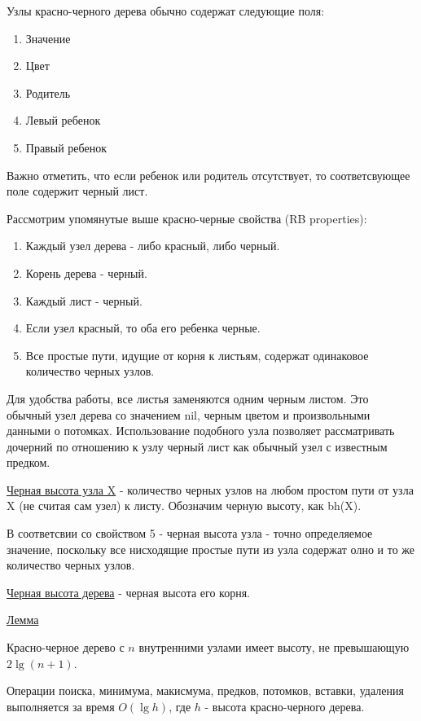 		Узлы красно-черного дерева обычно содержат следующие поля:
		\begin{enumerate}
			\item Значение
			\item Цвет
			\item Родитель
			\item Левый ребенок
			\item Правый ребенок
		\end{enumerate}	

		Важно отметить, что если ребенок или родитель отсутствует, то
		соответсвующее поле содержит черный лист.
		
		Рассмотрим упомянутые выше красно-черные свойства (RB properties):
		\begin{enumerate}
			\item Каждый узел дерева - либо красный, либо черный.
			\item Корень дерева - черный.
			\item Каждый лист - черный.
			\item Если узел красный, то оба его ребенка черные.
			\item Все простые пути, идущие от корня к листьям, содержат 
				  одинаковое количество черных узлов.
		\end{enumerate}
		
		Для удобства работы, все листья заменяются одним черным листом.
		Это обычный узел дерева со значением nil, черным цветом и произвольными данными
		о потомках. Использование подобного узла позволяет рассматривать дочерний 
		по отношению к узлу черный лист как обычный узел с известным предком.
		
		\underline{Черная высота узла X} - количество черных узлов на любом простом 
		пути от узла X (не считая сам узел) к листу. Обозначим черную высоту,
		как bh(X).

		В соответсвии со свойством 5 - черная высота узла - точно определяемое значение,
		поскольку все нисходящие простые пути из узла содержат олно и то же 
		количество черных узлов.
	
		\underline{Черная высота дерева} - черная высота его корня.

		\underline{Лемма}

		Красно-черное дерево с $n$ внутренними узлами имеет высоту, не превышающую 
		$2\lg(n+1)$.
	
		Операции поиска, минимума, макисмума, предков, потомков, вставки, удаления выполняется 
		за время $O(\lg h)$, где $h$ - высота красно-черного дерева.

